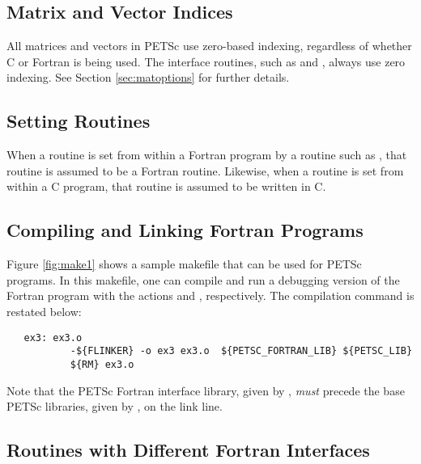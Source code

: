 \subsection{Matrix and Vector Indices}

All matrices and vectors in PETSc use zero-based indexing, regardless
of whether C or Fortran is being used.  The interface routines, such
as  and , always use zero
indexing.  See Section \ref{sec:matoptions} for further details.

\subsection{Setting Routines}

When a routine is set from within a Fortran program by a routine such
as , that routine is assumed to be a
Fortran routine. Likewise, when a routine is set from within a C
program, that routine is assumed to be written in C.

\subsection{Compiling and Linking Fortran Programs}
\label{sec:fortcompile}

Figure \ref{fig:make1} shows a sample makefile that can be used for
PETSc programs.  In this makefile, one can compile and run a debugging version
of the Fortran program  with the actions  and
, respectively. The compilation command is restated below:
\begin{verbatim}
   ex3: ex3.o 
           -${FLINKER} -o ex3 ex3.o  ${PETSC_FORTRAN_LIB} ${PETSC_LIB}
           ${RM} ex3.o
\end{verbatim}
Note that the PETSc Fortran interface library, given by 
, {\em must}   precede
the base PETSc libraries, given by , 
on the link line.

\subsection{Routines with Different Fortran Interfaces}
\label{sec:fortran_exceptions}

